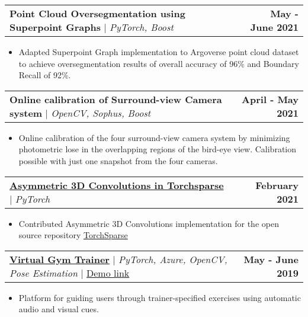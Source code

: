 \documentclass[12pt]{article}
\makeatletter
\newcommand{\resumeItem}[1]{
  \item\small{
    {#1 \vspace{-2pt}}
  }
}
\newcommand{\resumeProjectHeading}[2]{
    \item
    \begin{tabular*}{1.001\textwidth}{l@{\extracolsep{\fill}}r}
      \small#1 & \textbf{\small #2}\\
    \end{tabular*}\vspace{-7pt}
}
\newcommand{\resumeItemListStart}{\begin{itemize}\itemsep1pt}
\newcommand{\resumeItemListEnd}{\end{itemize}}
\makeatother
\begin{document}
        \resumeProjectHeading{\textbf{Point Cloud Oversegmentation using Superpoint Graphs} $|$ \emph{PyTorch, Boost}}{May - June 2021}
        \resumeItemListStart
            \resumeItem{Adapted Superpoint Graph implementation to Argoverse point cloud dataset to achieve oversegmentation results of overall accuracy of 96\% and Boundary Recall of 92\%.}
        \resumeItemListEnd
          \vspace{-20pt}
        \resumeProjectHeading{\textbf{Online calibration of Surround-view Camera system} $|$ \emph{OpenCV, Sophus, Boost}}{April - May 2021}
        \resumeItemListStart
            \resumeItem{Online calibration of the four surround-view camera system by minimizing photometric lose in the overlapping regions of the bird-eye view. Calibration possible with just one snapshot from the four cameras.}
        \resumeItemListEnd
        \vspace{-20pt}
        \resumeProjectHeading
        {\textbf{\href{https://github.com/mit-han-lab/torchsparse/pull/28}{Asymmetric 3D Convolutions in Torchsparse}} $|$ \emph{PyTorch}}{February 2021}
        \resumeItemListStart
            \resumeItem{Contributed Asymmetric 3D Convolutions implementation for the open source repository \hyperlink{https://github.com/mit-han-lab/torchsparse}{TorchSparse}}
        \resumeItemListEnd
          \vspace{-20pt}
      \resumeProjectHeading
          {\textbf{\href{https://github.com/durovo/edgehack}{Virtual Gym Trainer}} $|$ \emph{PyTorch, Azure, OpenCV, Pose Estimation} $|$ \href{https://www.youtube.com/watch?v=VLFEikGUWUI}{Demo link}}{May - June 2019}
          \resumeItemListStart
            \resumeItem{Platform for guiding users through trainer-specified exercises using automatic audio and visual cues.}
          \resumeItemListEnd 
\end{document}

